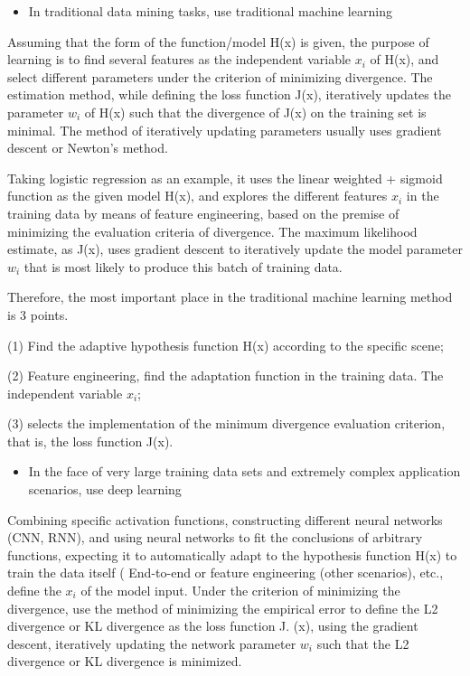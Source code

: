 \documentclass{article}
\begin{document}
	\begin{itemize}
		\item In traditional data mining tasks, use traditional machine learning
	\end{itemize}
	
	Assuming that the form of the function/model H(x) is given, the purpose of learning is to find several features as the independent variable $x_i$ of H(x), and select different parameters under the criterion of minimizing divergence. The estimation method, while defining the loss function J(x), iteratively updates the parameter $w_i$ of H(x) such that the divergence of J(x) on the training set is minimal. The method of iteratively updating parameters usually uses gradient descent or Newton's method.
	
	Taking logistic regression as an example, it uses the linear weighted + sigmoid function as the given model H(x), and explores the different features $x_i$ in the training data by means of feature engineering, based on the premise of minimizing the evaluation criteria of divergence. The maximum likelihood estimate, as J(x), uses gradient descent to iteratively update the model parameter $w_i$ that is most likely to produce this batch of training data.
	
	Therefore, the most important place in the traditional machine learning method is 3 points. 
	
	(1) Find the adaptive hypothesis function H(x) according to the specific scene;
	
	(2) Feature engineering, find the adaptation function in the training data. The independent variable $x_i$;
	
	(3) selects the implementation of the minimum divergence evaluation criterion, that is, the loss function J(x).
	
	\begin{itemize}
		\item In the face of very large training data sets and extremely complex application scenarios, use deep learning 
	\end{itemize}
	
	Combining specific activation functions, constructing different neural networks (CNN, RNN), and using neural networks to fit the conclusions of arbitrary functions, expecting it to automatically adapt to the hypothesis function H(x) to train the data itself ( End-to-end or feature engineering (other scenarios), etc., define the $x_i$ of the model input. Under the criterion of minimizing the divergence, use the method of minimizing the empirical error to define the L2 divergence or KL divergence as the loss function J. (x), using the gradient descent, iteratively updating the network parameter $w_i$ such that the L2 divergence or KL divergence is minimized.
	
\end{document}
